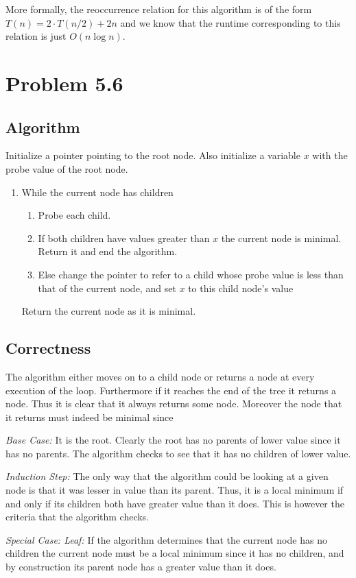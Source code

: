 \documentclass{article}
\begin{document}
More formally, the reoccurrence relation for this algorithm is of the form $T(n) = 2\cdot T(n/2)+ 2 n$ and we know that the runtime corresponding to this relation is just $O(n \log{n})$. 

\section{Problem 5.6}

\subsection{Algorithm}
Initialize a pointer pointing to the root node. Also initialize a variable $x$ with the probe value of the root node.
\begin{enumerate}
\item While the current node has children
\begin{enumerate}
\item Probe each child.
\item If both children have values greater than $x$ the current node is minimal. Return it and end the algorithm.
\item Else change the pointer to refer to a child whose probe value is less than that of the current node, and set $x$ to this child node's value
\end{enumerate}
Return the current node as it is minimal.
\end{enumerate}


\subsection{Correctness}
The algorithm either moves on to a child node or returns a node at every execution of the loop. Furthermore if it reaches the end of the tree it returns a node. Thus it is clear that it always returns some node. Moreover the node that it returns must indeed be minimal since 

\emph{Base Case:} It is the root. Clearly the root has no parents of lower value since it has no parents. The algorithm checks to see that it has no children of lower value. 

\emph{Induction Step: } The only way that the algorithm could be looking at a given node is that it was lesser in value than its parent. Thus, it is a local minimum if and only if its children both have greater value than it does. This is however the criteria that the algorithm checks.

\emph{Special Case: Leaf:} If the algorithm determines that the current node has no children the current node must be a local minimum since it has no children, and by construction its parent node has a greater value than it does.
\end{document}
